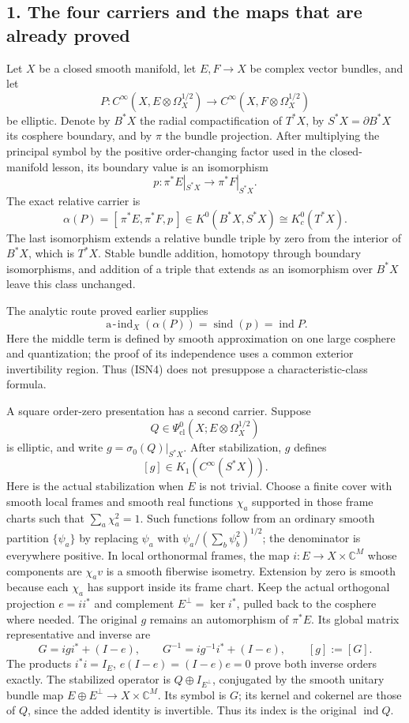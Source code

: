 \documentclass[
  11pt,
]{article}
\begin{document}
\subsection{1. The four carriers and the maps that are already
proved}\label{the-four-carriers-and-the-maps-that-are-already-proved}

Let \(X\) be a closed smooth manifold, let \(E,F\to X\) be complex
vector bundles, and let \[
 P:C^\infty(X,E\otimes\Omega_X^{1/2})
   \longrightarrow C^\infty(X,F\otimes\Omega_X^{1/2})
 \tag{ISN1}
\] be elliptic. Denote by \(B^*X\) the radial compactification of
\(T^*X\), by \(S^*X=\partial B^*X\) its cosphere boundary, and by
\(\pi\) the bundle projection. After multiplying the principal symbol by
the positive order-changing factor used in the closed-manifold lesson,
its boundary value is an isomorphism \[
 p:\pi^*E|_{S^*X}\longrightarrow \pi^*F|_{S^*X}.
 \tag{ISN2}
\] The exact relative carrier is \[
 \alpha(P)
 =
 [\,\pi^*E,\pi^*F,p\,]
 \in K^0(B^*X,S^*X)
 \cong K_c^0(T^*X).
 \tag{ISN3}
\] The last isomorphism extends a relative bundle triple by zero from
the interior of \(B^*X\), which is \(T^*X\). Stable bundle addition,
homotopy through boundary isomorphisms, and addition of a triple that
extends as an isomorphism over \(B^*X\) leave this class unchanged.

The analytic route proved earlier supplies \[
 \operatorname{a\!-\!ind}_X(\alpha(P))
   =\operatorname{sind}(p)
   =\operatorname{ind}P.
 \tag{ISN4}
\] Here the middle term is defined by smooth approximation on one large
cosphere and quantization; the proof of its independence uses a common
exterior invertibility region. Thus (ISN4) does not presuppose a
characteristic-class formula.

A square order-zero presentation has a second carrier. Suppose \[
 Q\in\Psi^0_{\mathrm{cl}}(X;E\otimes\Omega_X^{1/2})
 \tag{ISN5}
\] is elliptic, and write \(g=\sigma_0(Q)|_{S^*X}\). After
stabilization, \(g\) defines \[
 [g]\in K_1(C^\infty(S^*X)).
 \tag{ISN6}
\] Here is the actual stabilization when \(E\) is not trivial. Choose a
finite cover with smooth local frames and smooth real functions
\(\chi_a\) supported in those frame charts such that
\(\sum_a\chi_a^2=1\). Such functions follow from an ordinary smooth
partition \(\{\psi_a\}\) by replacing \(\psi_a\) with
\(\psi_a/(\sum_b\psi_b^2)^{1/2}\); the denominator is everywhere
positive. In local orthonormal frames, the map
\(i:E\to X\times\mathbb C^M\) whose components are \(\chi_a v\) is a
smooth fiberwise isometry. Extension by zero is smooth because each
\(\chi_a\) has support inside its frame chart. Keep the actual
orthogonal projection \(e=ii^*\) and complement \(E^\perp=\ker i^*\),
pulled back to the cosphere where needed. The original \(g\) remains an
automorphism of \(\pi^*E\). Its global matrix representative and inverse
are \[
 G=igi^*+(I-e),\qquad
 G^{-1}=ig^{-1}i^*+(I-e),\qquad [g]:=[G].
 \tag{ISS1}
\] The products \(i^*i=I_E\), \(e(I-e)=(I-e)e=0\) prove both inverse
orders exactly. The stabilized operator is \(Q\oplus I_{E^\perp}\),
conjugated by the smooth unitary bundle map \(E\oplus E^\perp\to
X\times\mathbb C^M\). Its symbol is \(G\); its kernel and cokernel are
those of \(Q\), since the added identity is invertible. Thus its index
is the original \(\operatorname{ind}Q\).
\end{document}
